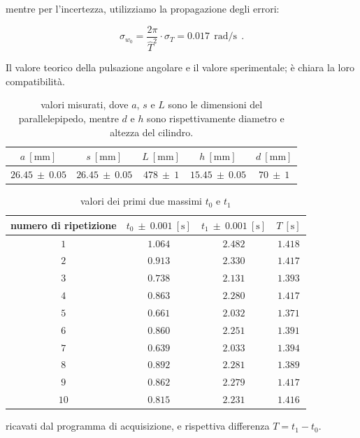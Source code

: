 \documentclass[a4paper,12pt]{article}
\begin{document}
mentre per l'incertezza, utilizziamo la propagazione degli errori:

\[
    \sigma_{w_0} = \frac{2 \pi}{\hat{T}^2} \cdot \sigma_T = 0.017 \ \ \text{rad/s} \ \ .
\]

Il valore teorico della pulsazione angolare e il valore sperimentale; è chiara la loro compatibilità.

\begin{table}[]
    \centering
    \begin{tabular}{c c c c c}
         \toprule
         $a \ \mathrm{[mm]}$&$s \ \mathrm{[mm]}$&$L \ \mathrm{[mm]}$&$h \ \mathrm{[mm]}$&$d \ \mathrm{[mm]}$ \\
         \midrule
         $26.45\ \pm \ 0.05$&$26.45 \ \pm \ 0.05$&$478 \ \pm \ 1$&$15.45 \ \pm \ 0.05$&$70 \ \pm \ 1$\\ 
         \bottomrule
    \end{tabular}
    \caption{\centering valori misurati, dove $a$, $s$ e $L$ sono le dimensioni del parallelepipedo, mentre $d$ e $h$ sono rispettivamente diametro e altezza del cilindro.}
    \label{tab:misure_dirette_pendoli}
\end{table}

\begin{table}[]
    \centering
    \begin{tabular}{c c c c}
        \toprule
        numero di ripetizione &$t_0 \ \pm \ 0.001 \ \mathrm{[s]}$&$t_1 \ \pm \ 0.001 \ \mathrm{[s]}$&$T \ \mathrm{[s]}$ \\
        \midrule
        $1$&$1.064$&$2.482$&$1.418$\\
        $2$&$0.913$&$2.330$&$1.417$\\
        $3$&$0.738$&$2.131$&$1.393$\\
        $4$&$0.863$&$2.280$&$1.417$\\
        $5$&$0.661$&$2.032$&$1.371$\\
        $6$&$0.860$&$2.251$&$1.391$\\
        $7$&$0.639$&$2.033$&$1.394$\\
        $8$&$0.892$&$2.281$&$1.389$\\
        $9$&$0.862$&$2.279$&$1.417$\\
        $10$&$0.815$&$2.231$&$1.416$\\
        \bottomrule
    \end{tabular}
    \caption{\centering valori dei primi due massimi $t_0$ e $t_1$} ricavati dal programma di acquisizione, e rispettiva differenza $T=t_1 - t_0$.
    \label{tab:misure_picchi}
\end{table}
\end{document}
